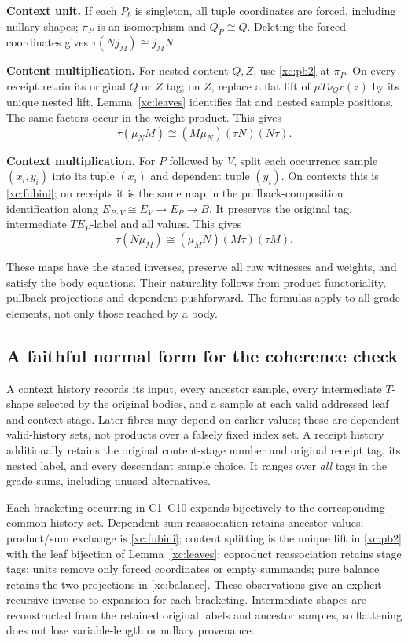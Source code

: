 \documentclass[11pt,a4paper]{article}
\theoremstyle{definition}
\begin{document}
\textbf{Context unit.} If each $P_b$ is singleton, all tuple coordinates
are forced, including nullary shapes; $\pi_P$ is an isomorphism and
$Q_P\cong Q$. Deleting the forced coordinates gives
$\tau(Nj_M)\cong j_MN$.

\textbf{Content multiplication.} For nested content $Q,Z$, use
\eqref{xc:pb2} at $\pi_P$. On every receipt retain its original $Q$ or
$Z$ tag; on $Z$, replace a flat lift of $\mu T\nu_Qr(z)$ by its unique
nested lift. Lemma~\ref{xc:leaves} identifies flat and nested sample
positions. The same factors occur in the weight product. This gives
\[
 \tau(\mu_NM)\cong(M\mu_N)(\tau N)(N\tau).
\]

\textbf{Context multiplication.} For $P$ followed by $V$, split each
occurrence sample $(x_i,y_i)$ into its tuple $(x_i)$ and dependent tuple
$(y_i)$. On contexts this is \eqref{xc:fubini}; on receipts it is the
same map in the pullback-composition identification along
$E_{P\cdot V}\cong E_V\to E_P\to B$. It preserves the original tag,
intermediate $TE_P$-label and all values. This gives
\[
 \tau(N\mu_M)\cong(\mu_MN)(M\tau)(\tau M).
\]

These maps have the stated inverses, preserve all raw witnesses and weights,
and satisfy the body equations. Their naturality follows from product
functoriality, pullback projections and dependent pushforward. The formulas
apply to all grade elements, not only those reached by a body.

\subsection{A faithful normal form for the coherence check}

A context history records its input, every ancestor sample, every intermediate
$T$-shape selected by the original bodies, and a sample at each valid
addressed leaf and context stage. Later fibres may depend on earlier values;
these are dependent valid-history sets, not products over a falsely fixed
index set. A receipt history additionally retains the original content-stage
number and original receipt tag, its nested label, and every descendant
sample choice. It ranges over \emph{all} tags in the grade sums, including
unused alternatives.

Each bracketing occurring in C1--C10 expands bijectively to the corresponding
common history set. Dependent-sum reassociation retains ancestor values;
product/sum exchange is \eqref{xc:fubini}; content splitting is the unique
lift in \eqref{xc:pb2} with the leaf bijection of
Lemma~\ref{xc:leaves}; coproduct reassociation retains stage tags; units
remove only forced coordinates or empty summands; pure balance retains the
two projections in \eqref{xc:balance}. These observations give an explicit
recursive inverse to expansion for each bracketing. Intermediate shapes
are reconstructed from the retained original labels and ancestor samples,
so flattening does not lose variable-length or nullary provenance.
\end{document}
